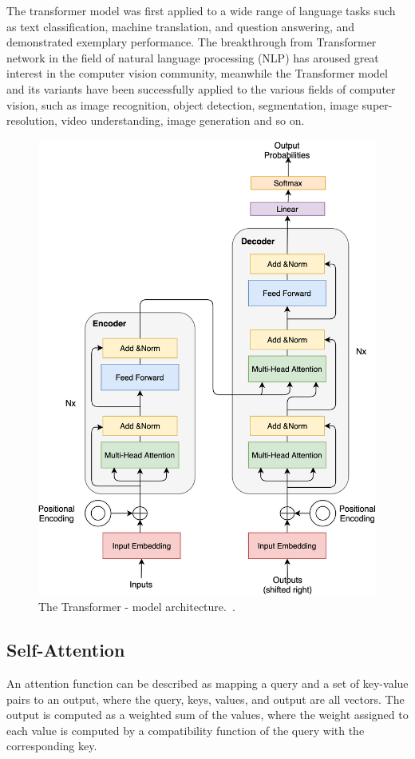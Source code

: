 The transformer model  was first applied to a wide range of language tasks such as text classification, machine translation, and question answering, and demonstrated exemplary performance. The breakthrough from Transformer network in the field of natural language processing (NLP) has aroused great interest in the computer vision community, meanwhile the Transformer model and its variants have been successfully applied to the various fields of computer vision, such as image recognition, object detection, segmentation, image super-resolution, video understanding, image generation and so on. 

\begin{figure}[!htbp]
	\centering
	\includegraphics[width = 0.5 \textwidth]{figures/transformer.png}
	\caption[The Transformer - model architecture]
	{ The Transformer - model architecture.~\cite{vaswani2017attention}.}
	\label{fig:transformer}
\end{figure}

\subsection{Self-Attention}
An attention function can be described as mapping a query and a set of key-value pairs to an output, where the query, keys, values, and output are all vectors. The output is computed as a weighted sum of the values, where the weight assigned to each value is computed by a compatibility function of the query with the corresponding key.


